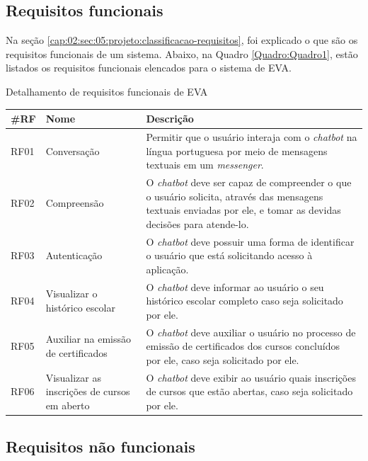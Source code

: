\subsection{Requisitos funcionais}

Na seção \ref{cap:02:sec:05:projeto:classificacao-requisitos}, foi explicado o que são os requisitos funcionais de um sistema. 
Abaixo, na Quadro \ref{Quadro:Quadro1}, estão listados os requisitos funcionais elencados para o sistema de EVA.

\begin{quadro}[htb!]
\caption{Detalhamento de requisitos funcionais de EVA}
\label{Quadro:Quadro1}
\begin{tabular}{|p{1.2cm}|p{3.5cm}|p{7.5cm}|}
  \hline
   \textbf{\#RF} & \textbf{Nome}  & \textbf{Descrição}  \\
    \hline
    RF01 & Conversação & Permitir que o usuário interaja com o \textit{chatbot} na língua portuguesa por meio de mensagens textuais em um \textit{messenger}. \\
    \hline
    RF02 & Compreensão & O \textit{chatbot} deve ser capaz de compreender o que o usuário solicita, através das mensagens textuais enviadas por ele, e tomar as devidas decisões para atende-lo. \\
    \hline
    RF03 & Autenticação & O \textit{chatbot} deve possuir uma forma de identificar o usuário que está solicitando acesso à aplicação. \\
   \hline
     RF04 & Visualizar o histórico escolar & O \textit{chatbot} deve informar ao usuário o seu histórico escolar completo caso seja solicitado por ele. \\
   \hline
    RF05 & Auxiliar na emissão de certificados & O \textit{chatbot} deve auxiliar o usuário no processo de emissão de certificados dos cursos concluídos por ele, caso seja solicitado por ele. \\
   \hline
    RF06 & Visualizar as inscrições de cursos em aberto & O \textit{chatbot} deve exibir ao usuário quais inscrições de cursos que estão abertas, caso seja solicitado por ele. \\
   \hline
\end{tabular}
\mfonte
\end{quadro}

\subsection{Requisitos não funcionais}\label{cap3-requisitos-nao-funcionais}

